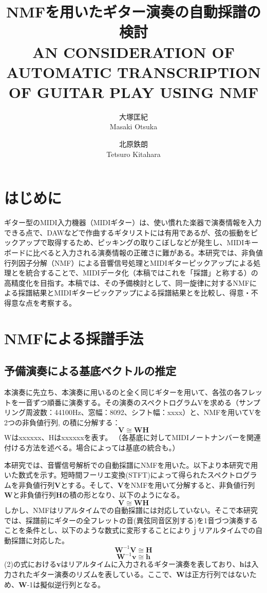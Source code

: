 \documentclass[twocolumn, a4paper]{ieicejsp}
\title{
    {\bf NMFを用いたギター演奏の自動採譜の検討\\}
    {\normalsize AN CONSIDERATION OF AUTOMATIC TRANSCRIPTION OF GUITAR PLAY USING NMF}
}
\author{
    大塚匡紀\\ Masaki Otsuka\and
    北原鉄朗\\ Tetsuro Kitahara
}
\begin{document}
\maketitle

\section{はじめに}
  ギター型のMIDI入力機器（MIDIギター）は、使い慣れた楽器で演奏情報を入力できる点で、DAWなどで作曲するギタリストには有用であるが、弦の振動をピックアップで取得するため、ピッキングの取りこぼしなどが発生し、MIDIキーボードに比べると入力される演奏情報の正確さに難がある。本研究では、非負値行列因子分解（NMF）による音響信号処理とMIDIギターピックアップによる処理とを統合することで、MIDIデータ化（本稿ではこれを「採譜」と称する）の高精度化を目指す。本稿では、その予備検討として、同一旋律に対するNMFによる採譜結果とMIDIギターピックアップによる採譜結果とを比較し、得意・不得意な点を考察する。

\section{NMFによる採譜手法}
\subsection{予備演奏による基底ベクトルの推定}
本演奏に先立ち、本演奏に用いるのと全く同じギターを用いて、各弦の各フレットを一音ずつ順番に演奏する。その演奏のスペクトログラムVを求める（サンプリング周波数：44100Hz、窓幅：8092、シフト幅：xxxx）と、NMFを用いてVを2つの非負値行列, の積に分解する：
\begin{equation}
    \mathbf{V} \cong \mathbf{W}\mathbf{H}
\end{equation}
Wはxxxxxx、Hはxxxxxxを表す。
（各基底に対してMIDIノートナンバーを関連付ける方法を述べる。場合によっては基底の統合も。）



本研究では、音響信号解析での自動採譜にNMFを用いた。以下より本研究で用いた数式を示す。短時間フーリエ変換(STFT)によって得られたスペクトログラムを非負値行列\textbf{V}とする。そして、\textbf{V}をNMFを用いて分解すると、非負値行列\textbf{W}と非負値行列\textbf{H}の積の形となり、以下のようになる。
\begin{equation}
    \mathbf{V} \cong \mathbf{W}\mathbf{H}
\end{equation}
しかし、NMFはリアルタイムでの自動採譜には対応していない。そこで本研究では、採譜前にギターの全フレットの音(異弦同音区別する)を1音づつ演奏することを条件とし、以下のような数式に変形することによりｊリアルタイムでの自動採譜に対応した。
\begin{equation}
    \mathbf{W}^{-1}\mathbf{V} \cong \mathbf{H}
\end{equation}
\begin{equation}
    \mathbf{W}^{-1}\mathbf{v} \cong \mathbf{h}
\end{equation}
(2)の式における\textbf{v}はリアルタイムに入力されるギター演奏を表しており、\textbf{h}は入力されたギター演奏のリズムを表している。ここで、\textbf{W}は正方行列ではないため、\textbf{W}-1は擬似逆行列となる。
\end{document}
